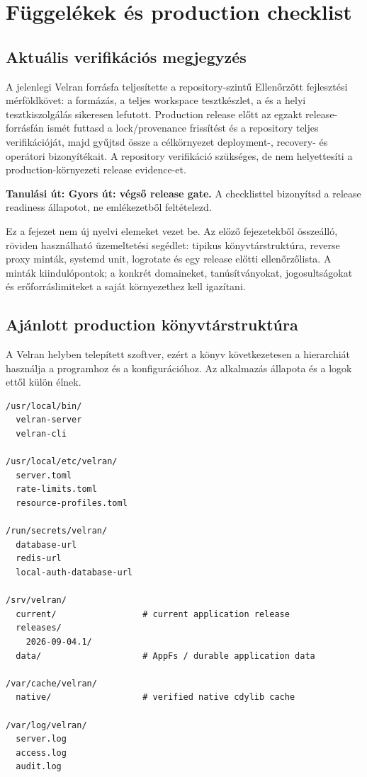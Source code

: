 

\chapter{Függelékek és production checklist}

\section{Aktuális verifikációs megjegyzés}

A jelenlegi Velran forrásfa teljesítette a repository-szintű Ellenőrzött fejlesztési mérföldkövet: a formázás, a teljes workspace tesztkészlet, a  és a helyi tesztkiszolgálás sikeresen lefutott. Production release előtt az egzakt release-forrásfán ismét futtasd a lock/provenance frissítést és a repository teljes verifikációját, majd gyűjtsd össze a célkörnyezet deployment-, recovery- és operátori bizonyítékait. A repository verifikáció szükséges, de nem helyettesíti a production-környezeti release evidence-et.

\noindent\textbf{Tanulási út: Gyors út: végső release gate.} A checklisttel bizonyítsd a release readiness állapotot, ne emlékezetből feltételezd.\par\medskip

Ez a fejezet nem új nyelvi elemeket vezet be. Az előző fejezetekből összeálló, röviden használható üzemeltetési segédlet: tipikus könyvtárstruktúra, reverse proxy minták, systemd unit, logrotate és egy release előtti ellenőrzőlista. A minták kiindulópontok; a konkrét domaineket, tanúsítványokat, jogosultságokat és erőforráslimiteket a saját környezethez kell igazítani.

\section{Ajánlott production könyvtárstruktúra}

A Velran helyben telepített szoftver, ezért a könyv következetesen a  hierarchiát használja a programhoz és a konfigurációhoz. Az alkalmazás állapota és a logok ettől külön élnek.

\begin{lstlisting}
/usr/local/bin/
  velran-server
  velran-cli

/usr/local/etc/velran/
  server.toml
  rate-limits.toml
  resource-profiles.toml

/run/secrets/velran/
  database-url
  redis-url
  local-auth-database-url

/srv/velran/
  current/                 # current application release
  releases/
    2026-09-04.1/
  data/                    # AppFs / durable application data

/var/cache/velran/
  native/                  # verified native cdylib cache

/var/log/velran/
  server.log
  access.log
  audit.log
\end{lstlisting}

